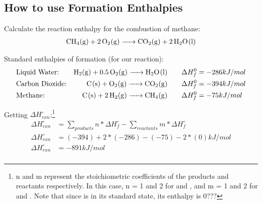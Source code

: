 \documentclass[../CHEM152Notes.tex]{subfiles}
\begin{document}
\subsection*{How to use Formation Enthalpies}
\begin{exmp}
    Calculate the reaction enthalpy for the combustion of methane:
        \begin{equation*}
            \begin{aligned}
                \ce{CH4_(g) + 2 O2_(g) -> CO2_(g) + 2 H2O_(l)}
            \end{aligned}
        \end{equation*}
\end{exmp}
Standard enthalpies of formation (for our reaction):
\begin{equation*}
    \begin{aligned}
        &\text{Liquid Water:} &\ce{H2_(g) + 0.5 O2_(g) -> H2O_(l)} & \quad & \Delta H^0_f &= -286 kJ/mol \\
        &\text{Carbon Dioxide:} &\ce{C_(s) + O2_(g) -> CO2_(g)} & \quad & \Delta H^0_f &= -394 kJ/mol \\
        &\text{Methane:} &\ce{C_(s) + 2 H2_(g) -> CH4_(g)} & \quad & \Delta H^0_f &= -75 kJ/mol \\
    \end{aligned}
\end{equation*}

Getting $\Delta H^\circ_{rxn}$:\footnote{n and m represent the stoichiometric coefficients of the products and reactants respectively. In this case, n = 1 and 2 for  and , and m = 1 and 2 for  and . Note that since  is in its standard state, its enthalpy is 0???}
\begin{equation*}
    \begin{aligned}
        \Delta H^\circ_{rxn} &= \sum_{products} n * \Delta H^\circ_{f} - \sum_{reactants} m * \Delta H^\circ_{f} \\
        \Delta H^\circ_{rxn} &= (-394) + 2*(-286) - (-75) - 2*(0) kJ/mol \\
        \Delta H^\circ_{rxn} &= -891 kJ/mol \\
    \end{aligned}
\end{equation*}
\end{document}
